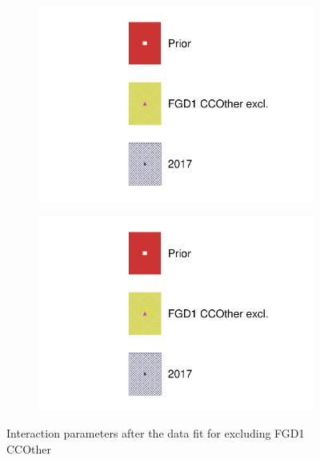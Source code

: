 \begin{figure}[h]
	\begin{subfigure}[t]{0.49\textwidth}
		\includegraphics[width=\textwidth, trim={0mm 0mm 0mm 0mm}, clip,page=20]{figures/mach3/data/alt/2017b_NoFGD1CCOth_Data_merg_2017b_NewData_NewDet_UpdXsecStep_2Xsec_4Det_5Flux_0}
	\end{subfigure}
	\begin{subfigure}[t]{0.49\textwidth}
		\includegraphics[width=\textwidth, trim={0mm 0mm 0mm 0mm}, clip,page=21]{figures/mach3/data/alt/2017b_NoFGD1CCOth_Data_merg_2017b_NewData_NewDet_UpdXsecStep_2Xsec_4Det_5Flux_0}
	\end{subfigure}
	\caption{Interaction parameters after the data fit for excluding FGD1 CCOther}
	\label{fig:xsec_data_nofgd1ccoth}
\end{figure}

